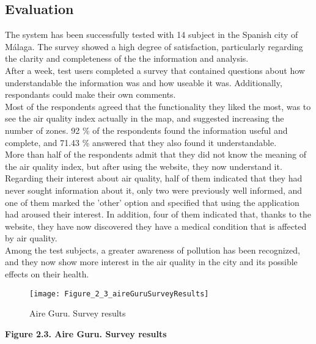 \subsection*{Evaluation}

The system has been successfully tested with 14 subject in the Spanish city of Málaga. The survey showed a high degree of satisfaction, 
particularly regarding the clarity and completeness of the the information and analysis.\\

After a week, test users completed a survey that contained questions about how understandable the information was
and how useable it was. Additionally, respondants could make their own comments.\\

Most of the respondents agreed that the functionality they liked the most, was to see the air quality index actually in the
map, and suggested increasing the number of zones.
92 \% of the respondents found the information useful and complete, and 71.43 \% answered that they also found it
understandable.\\

More than half of the respondents admit that they did not know the meaning of the air quality index, but after
using the website, they now understand it.\\

Regarding their interest about air quality, half of them indicated that they had never sought information about it,
only two were previously well informed, and one of them marked the 'other' option and specified that using the application had aroused their interest.
In addition, four of them indicated that, thanks to the website, they have now discovered they have a medical condition that is affected by air quality.\\

Among the test subjects, a greater awareness of pollution has been recognized, and they now show more interest in the
air quality in the city and its possible effects on their health.

\begin{figure}[ht]
   \centering
   \texttt{[image: Figure\_2\_3\_aireGuruSurveyResults]}
   \caption{Aire Guru. Survey results}
\end{figure}

\begin{center}
   \bf Figure 2.3. Aire Guru. Survey results\\
   \end{center}